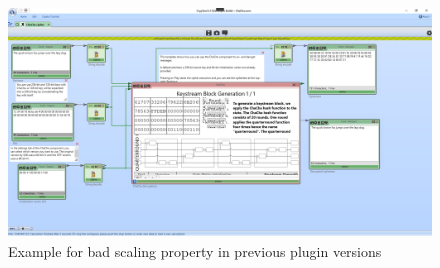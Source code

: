 \begin{figure}
\caption{Example for bad scaling property in previous plugin versions}
\label{fig:plugin.scaling.bug}
\includegraphics[width=\textwidth]{figures/scaling-bug-example.png}
\end{figure}


